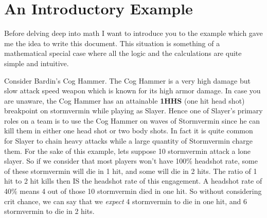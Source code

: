 \documentclass{article}
\begin{document}
\begin{comment}
\subsubsection{Variable}
Here is a list of variable names.
\begin{enumerate}
\item $\tau$ = Time to Kill
\item $\rho$ = Crit Chance
\item $\phi$ = Headshot Percentage
\item $\alpha$ = Attack Speed
\end{enumerate}

\begin{align*}
P(A_1) = \rho + \phi = 0.55 && P(A_2) = 1 - P(A_1) = 0.45
\end{align*}
\begin{align*}
\mathbb{E}(\tau) = \alpha (P(A_1) (t_1) + P(A_2) t_2)
\end{align*}

\begin{align*}
P(A_1) = \mathbf{HS\%} + \mathbf{C\%} = 0.55 && P(A_2) = 1 - P(A_1) = 0.45
\end{align*}
\begin{align*}
\mathbb{E}(\mathbf{TTK}) = \mathbf{AS} (P(A_1) (t_1) + P(A_2) t_2)
\end{align*}
\end{comment}

\section{An Introductory Example}

\par

Before delving deep into math I want to introduce you to the example which gave me the idea to write this document. This situation is something of a mathematical special case where all the logic and the calculations are quite simple and intuitive.

Consider Bardin's Cog Hammer. The Cog Hammer is a very high damage but slow attack speed weapon which is known for its high armor damage. In case you are unaware, the Cog Hammer has an attainable \textbf{1HHS} (one hit head shot) breakpoint on stormvermin while playing as Slayer. Hence one of Slayer's primary roles on a team is to use the Cog Hammer on waves of Stormvermin since he can kill them in either one head shot or two body shots. In fact it is quite common for Slayer to chain heavy attacks while a large quantity of Stormvermin charge them. For the sake of this example, lets suppose 10 stormvermin attack a lone slayer. So if we consider that most players won't have 100\% headshot rate, some of these stormvermin will die in 1 hit, and some will die in 2 hits. The ratio of 1 hit to 2 hit kills then IS the headshot rate of this engagement. A headshot rate of 40\% means 4 out of those 10 stormvermin died in one hit. So without considering crit chance, we can say that we \emph{expect} 4 stormvermin to die in one hit, and 6 stormvermin to die in 2 hits.
\end{document}
